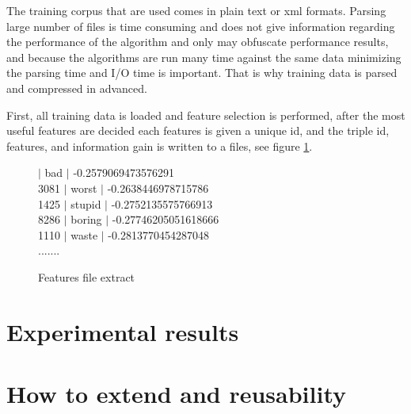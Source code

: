 \documentclass{report}
\begin{document}
The training corpus that are used comes in plain text or xml formats. Parsing large number of files is time consuming and does not give information regarding the performance of the algorithm and only may obfuscate performance results, and because the algorithms are run many time against the same data minimizing the parsing time and I/O time is important. That is why training data is parsed and compressed in advanced.

First, all training data is loaded and feature selection is performed, after the most useful features are decided each features is given a unique id, and the triple id, features, and information gain is written to a files, see figure \ref{featureextract}.

\begin{figure}[h!]
 \label{featureextract}
   $|$ bad $|$ -0.2579069473576291 \\
3081 $|$ worst $|$ -0.2638446978715786  \\
1425 $|$ stupid $|$ -0.2752135575766913 \\
8286 $|$ boring $|$ -0.27746205051618666 \\
1110 $|$ waste $|$ -0.2813770454287048 \\
.......
  \caption{Features file extract}
\end{figure}

\chapter{Experimental results}

\chapter{How to extend and reusability}

{}

\end{document}

